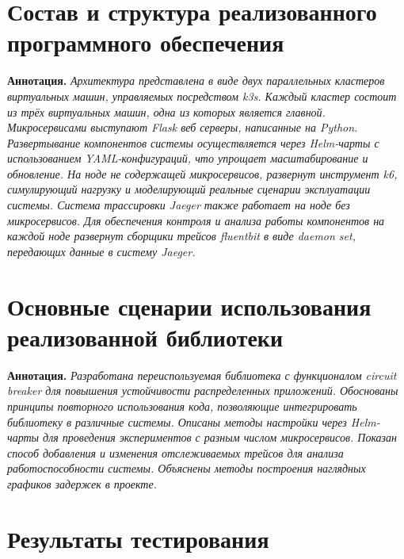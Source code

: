 

\section{Состав и структура реализованного программного обеспечения}

\textbf{Аннотация. } \textit{Архитектура представлена в виде двух параллельных кластеров виртуальных машин, управляемых посредством k3s. Каждый кластер состоит из трёх виртуальных машин, одна из которых является главной. Микросервисами выступают Flask веб серверы, написанные на Python.  Развертывание компонентов системы осуществляется через Helm-чарты с использованием YAML-конфигураций, что упрощает масштабирование и обновление. На ноде не содержащей микросервисов, развернут инструмент k6, симулирующий нагрузку и моделирующий реальные сценарии эксплуатации системы.  Система трассировки Jaeger также работает на ноде без микросервисов. Для обеспечения контроля и анализа работы компонентов на каждой ноде развернут сборщики трейсов fluentbit в виде daemon set, передающих данные в систему Jaeger. }



\section{Основные сценарии использования реализованной библиотеки }

\textbf{Аннотация. } \textit{ Разработана переиспользуемая библиотека с функционалом circuit breaker для повышения устойчивости распределенных приложений. Обоснованы принципы повторного использования кода, позволяющие интегрировать библиотеку в различные системы. Описаны методы настройки через Helm-чарты для проведения экспериментов с разным числом микросервисов. Показан способ добавления и изменения отслеживаемых трейсов для анализа работоспособности системы. Объяснены методы построения наглядных графиков задержек в проекте.}


\section{Результаты тестирования}

